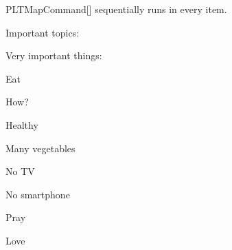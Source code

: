 \documentclass[a4paper, 11pt]{article}
\begin{document}
\begin{macro}{PLTMapCommand}[]
     sequentially runs  in every item.
\end{macro}

\begin{tcblisting}{}
    Important topics: \PLTMapCommand{\showwithbullet}
\end{tcblisting}

\begin{tcblisting}{}

    \begin{importantlisting}
        Very important things:\par
        \item Eat%
        \begin{importantlisting}
            How?
            \item Healthy
            \item Many vegetables
            \item No TV
            \item No smartphone
        \end{importantlisting}
        \par
        \item Pray\par
        \item Love\par
    \end{importantlisting}
\end{tcblisting}
\end{document}
